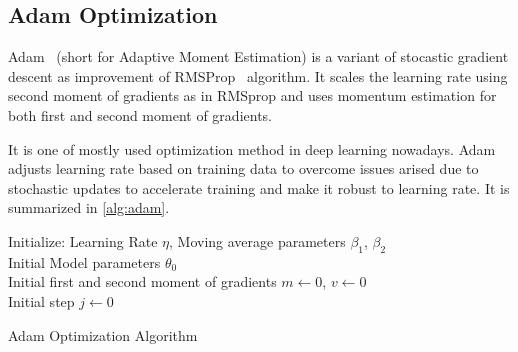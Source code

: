 \subsection{Adam Optimization}

Adam~\cite{kingma_adam_2017}  (short for Adaptive Moment Estimation) is a variant of stocastic gradient descent as improvement of RMSProp~ \cite{hinton_lecture_nodate} algorithm. 
It scales the learning rate using second moment of gradients as in RMSprop and uses momentum estimation for both first and second moment of gradients. 

It is one of mostly used optimization method in deep learning nowadays. 
Adam adjusts learning rate based on training data to overcome issues arised due to stochastic updates to accelerate training and make it robust to learning rate. 
It is summarized in \ref{alg:adam}. 

\begin{algorithm}[H]
	\SetAlgoLined
	\DontPrintSemicolon %
	Initialize: Learning Rate $\eta$, Moving average parameters $\beta_1$, $\beta_2$\\
	Initial Model parameters $\theta_0$ \\
	Initial first and second moment of gradients $m \leftarrow 0$, $v \leftarrow 0$ \\
	Initial step $j \leftarrow 0$ \\
	\caption{Adam Optimization Algorithm}
	\label{alg:adam}
\end{algorithm}

